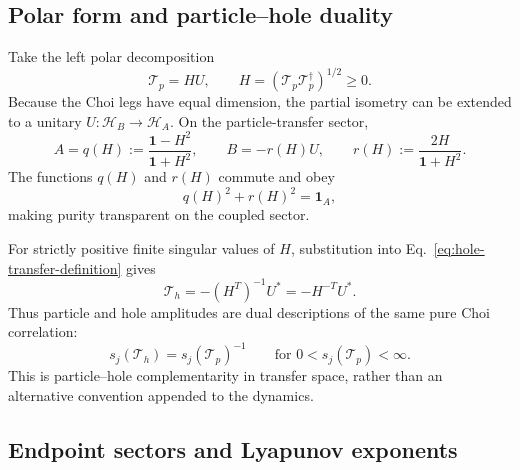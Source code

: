 \documentclass[aps,prb,onecolumn,nofootinbib,superscriptaddress]{revtex4-2}
\newcommand{\I}{\mathbf{1}}
\newcommand{\cH}{\mathcal{H}}
\theoremstyle{plain}
\theoremstyle{definition}
\begin{document}
\subsection{Polar form and particle--hole duality}

Take the left polar decomposition
\begin{equation}
  \mathcal T_p=HU,
  \qquad
  H=(\mathcal T_p\mathcal T_p^\dagger)^{1/2}\geq0.
  \label{eq:left-polar-transfer}
\end{equation}
Because the Choi legs have equal dimension, the partial isometry can be
extended to a unitary \(U:\cH_B\to\cH_A\).  On the particle-transfer
sector,
\begin{equation}
  A=q(H):=\frac{\I-H^2}{\I+H^2},
  \qquad
  B=-r(H)U,
  \qquad
  r(H):=\frac{2H}{\I+H^2}.
  \label{eq:qr-functions}
\end{equation}
The functions \(q(H)\) and \(r(H)\) commute and obey
\begin{equation}
  q(H)^2+r(H)^2=\I_A,
  \label{eq:qr-circle}
\end{equation}
making purity transparent on the coupled sector.

For strictly positive finite singular values of \(H\), substitution into
Eq.~\eqref{eq:hole-transfer-definition} gives
\begin{equation}
  \mathcal T_h
  =
  -\left(H^T\right)^{-1}U^*
  =
  -H^{-T}U^* .
  \label{eq:particle-hole-transfer-duality}
\end{equation}
Thus particle and hole amplitudes are dual descriptions of the same pure
Choi correlation:
\begin{equation}
  s_j(\mathcal T_h)
  =
  s_j(\mathcal T_p)^{-1}
  \qquad
  \text{for }0<s_j(\mathcal T_p)<\infty .
  \label{eq:reciprocal-singular-values}
\end{equation}
This is particle--hole complementarity in transfer space, rather than an
alternative convention appended to the dynamics.

\subsection{Endpoint sectors and Lyapunov exponents}
\end{document}
